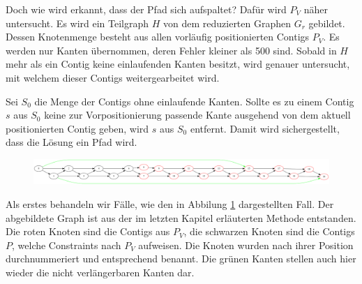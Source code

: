 Doch wie wird erkannt, dass der Pfad sich aufspaltet? Dafür wird $P_V$ näher untersucht.
Es wird ein Teilgraph $H$ von dem reduzierten Graphen $G_r$ gebildet.
Dessen Knotenmenge besteht aus allen vorläufig positionierten Contigs $P_V$. 
Es werden nur Kanten übernommen, deren Fehler kleiner als 500 sind. Sobald in $H$ mehr als ein Contig keine einlaufenden Kanten besitzt, wird genauer untersucht, mit welchem dieser Contigs weitergearbeitet wird.

Sei $S_0$ die Menge der Contigs ohne einlaufende Kanten. Sollte es zu einem Contig $s$ aus $S_0$ keine zur Vorpositionierung passende Kante 
ausgehend von dem aktuell positionierten Contig 
geben, wird $s$ aus $S_0$ entfernt. Damit wird sichergestellt, dass die Lösung ein Pfad 
wird.

\begin{figure}
	\begin{center}
		\includegraphics[width=1\textwidth]{bilder/msplit3}
	\end{center}
	\label{msplit}
	\caption{}
\end{figure}

Als erstes behandeln wir Fälle, wie den in Abbilung \ref{msplit} dargestellten Fall. Der abgebildete Graph ist aus der im letzten Kapitel erläuterten Methode entstanden. Die roten Knoten sind die Contigs aus $P_V$, die schwarzen Knoten sind die Contigs $P$, welche Constraints nach $P_V$ aufweisen. Die Knoten wurden nach ihrer Position durchnummeriert und entsprechend benannt. 
Die grünen Kanten stellen auch hier wieder die nicht verlängerbaren Kanten dar.



